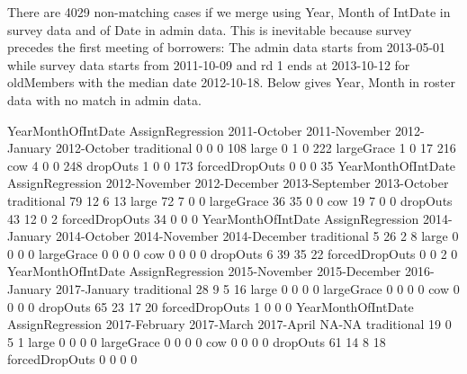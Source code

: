 There are 4029 non-matching cases if we merge using \textsf{Year, Month} of \textsf{IntDate} in survey data and of \textsf{Date} in admin data. This is inevitable because survey precedes the first meeting of borrowers: The admin data starts from 2013-05-01 while survey data starts from 2011-10-09 and rd 1 ends at 2013-10-12 for \textsf{oldMember}s with the median date 2012-10-18. Below gives \textsf{Year, Month} in roster data with no match in admin data.
\begin{Schunk}
\begin{Soutput}
                YearMonthOfIntDate
AssignRegression 2011-October 2011-November 2012-January 2012-October
  traditional               0             0            0          108
  large                     0             1            0          222
  largeGrace                1             0           17          216
  cow                       4             0            0          248
  dropOuts                  1             0            0          173
  forcedDropOuts            0             0            0           35
                YearMonthOfIntDate
AssignRegression 2012-November 2012-December 2013-September 2013-October
  traditional               79            12              6           13
  large                     72             7              0            0
  largeGrace                36            35              0            0
  cow                       19             7              0            0
  dropOuts                  43            12              0            2
  forcedDropOuts            34             0              0            0
                YearMonthOfIntDate
AssignRegression 2014-January 2014-October 2014-November 2014-December
  traditional               5           26             2             8
  large                     0            0             0             0
  largeGrace                0            0             0             0
  cow                       0            0             0             0
  dropOuts                  6           39            35            22
  forcedDropOuts            0            0             2             0
                YearMonthOfIntDate
AssignRegression 2015-November 2015-December 2016-January 2017-January
  traditional               28             9            5           16
  large                      0             0            0            0
  largeGrace                 0             0            0            0
  cow                        0             0            0            0
  dropOuts                  65            23           17           20
  forcedDropOuts             1             0            0            0
                YearMonthOfIntDate
AssignRegression 2017-February 2017-March 2017-April NA-NA
  traditional               19          0          5     1
  large                      0          0          0     0
  largeGrace                 0          0          0     0
  cow                        0          0          0     0
  dropOuts                  61         14          8    18
  forcedDropOuts             0          0          0     0
\end{Soutput}
\end{Schunk}
